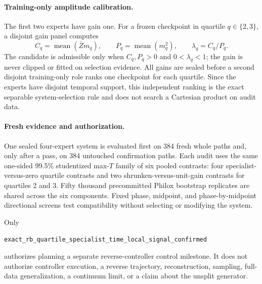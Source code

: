 \documentclass[11pt]{article}
\begin{document}
\paragraph{Training-only amplitude calibration.}
The first two experts have gain one.  For a frozen checkpoint in quartile
$q\in\{2,3\}$, a disjoint gain panel computes
\[
  C_q=\operatorname{mean}(\bar Z m_q),\qquad
  P_q=\operatorname{mean}(m_q^2),\qquad
  \lambda_q=C_q/P_q.
\]
The candidate is admissible only when $C_q,P_q>0$ and
$0<\lambda_q<1$; the gain is never clipped or fitted on selection evidence.
All gains are sealed before a second disjoint training-only role ranks one
checkpoint for each quartile.  Since the experts have disjoint temporal
support, this independent ranking is the exact separable system-selection
rule and does not search a Cartesian product on audit data.

\paragraph{Fresh evidence and authorization.}
One sealed four-expert system is evaluated first on 384 fresh whole paths and,
only after a pass, on 384 untouched confirmation paths.  Each audit uses the
same one-sided 99.5\% studentized max-$T$ family of six pooled contrasts: four
specialist-versus-zero quartile contrasts and two shrunken-versus-unit-gain
contrasts for quartiles 2 and 3.  Fifty thousand precommitted Philox bootstrap
replicates are shared across the six components.  Fixed phase, midpoint, and
phase-by-midpoint directional screens test compatibility without selecting or
modifying the system.

Only
\begin{center}
\texttt{exact\_rb\_quartile\_specialist\_time\_local\_signal\_confirmed}
\end{center}
authorizes planning a separate reverse-controller control milestone.  It
does not authorize controller execution, a reverse trajectory,
reconstruction, sampling, full-data generalization, a continuum limit, or a
claim about the unsplit generator.
\end{document}
